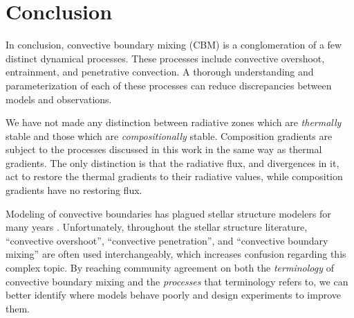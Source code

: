 \section{Conclusion}
\label{sec:conclusions}
In conclusion, convective boundary mixing (CBM) is a conglomeration of a few distinct dynamical processes.
These processes include convective overshoot, entrainment, and penetrative convection.
A thorough understanding and parameterization of each of these processes can reduce discrepancies between models and observations.

We have not made any distinction between radiative zones which are \emph{thermally} stable and those which are \emph{compositionally} stable.
Composition gradients are subject to the processes discussed in this work in the same way as thermal gradients.
The only distinction is that the radiative flux, and divergences in it, act to restore the thermal gradients to their radiative values, while composition gradients have no restoring flux.

Modeling of convective boundaries has plagued stellar structure modelers for many years \citep{mesa1, mesa4, mesa5}.
Unfortunately, throughout the stellar structure literature, ``convective overshoot'', ``convective penetration'', and ``convective boundary mixing'' are often used interchangeably, which increases confusion regarding this complex topic.
By reaching community agreement on both the \emph{terminology} of convective boundary mixing and the \emph{processes} that terminology refers to, we can better identify where models behave poorly and design experiments to improve them.


